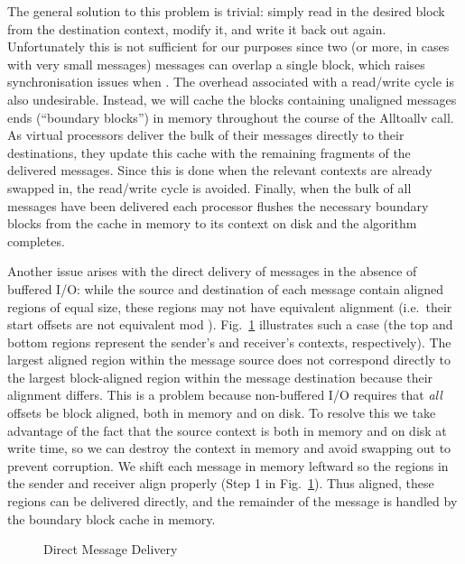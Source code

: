 \documentclass[12pt]{carletoncsthesis}
\begin{document}
The general solution to this problem is trivial: simply read in the desired
block from the destination context, modify it, and write it back out again.
Unfortunately this is not sufficient for our purposes since two (or more,
in cases with very small messages) messages can overlap a single block,
which raises synchronisation issues when .  The overhead associated
with a read/write cycle is also undesirable.  Instead, we will cache the
blocks containing unaligned messages ends (``boundary blocks'') in memory
throughout the course of the Alltoallv call.  As virtual processors deliver
the bulk of their messages directly to their destinations, they update this
cache with the remaining fragments of the delivered messages.  Since this is
done when the relevant contexts are already swapped in, the read/write cycle
is avoided.  Finally, when the bulk of all messages have been delivered each
processor flushes the necessary boundary blocks from the cache in memory to
its context on disk and the algorithm completes.

Another issue arises with the direct delivery of messages in the absence
of buffered I/O: while the source and destination of each message contain
aligned regions of equal size, these regions may not have equivalent
alignment (i.e.\ their start offsets are not equivalent mod ).
Fig.~\ref{message-direct} illustrates such a case (the top and bottom
regions represent the sender's and receiver's contexts, respectively).
The largest aligned region within the message source does not correspond
directly to the largest block-aligned region within the message destination
because their alignment differs.  This is a problem because non-buffered I/O
requires that {\em all} offsets be block aligned, both in memory and on disk.
To resolve this we take advantage of the fact that the source context is
both in memory and on disk at write time, so we can destroy the context in
memory and avoid swapping out to prevent corruption.  We shift each message
in memory leftward so the regions in the sender and receiver align properly
(Step 1 in Fig.~\ref{message-direct}).  Thus aligned, these regions can
be delivered directly, and the remainder of the message is handled by the
boundary block cache in memory.

\begin{figure}[ht]
\begin{center}
\caption{Direct Message Delivery}
\label{message-direct}
\end{center}
\end{figure}
\end{document}
